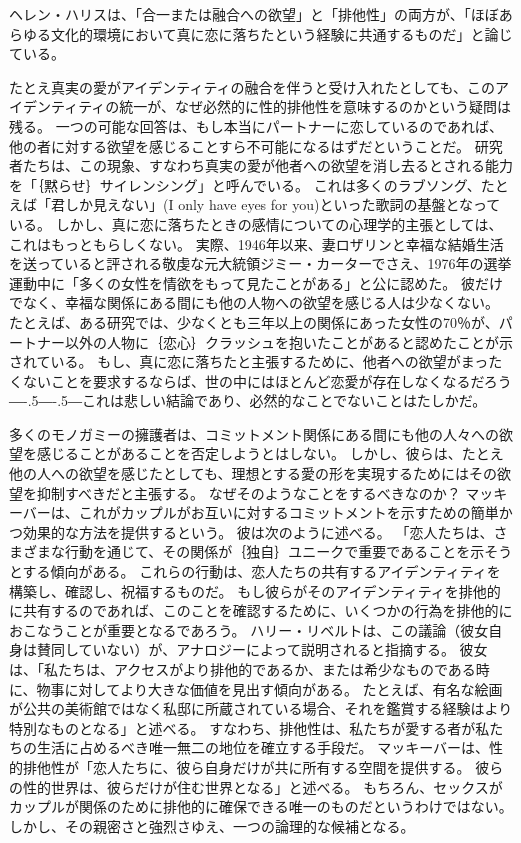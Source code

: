\documentclass[paper=a4,book,openany]{jlreq}
\newcommand{\ig}[1]{}           %
\def\DDASH{―\kern-.5\zw―\kern-.5\zw―} %
\begin{document}
ヘレン・ハリス\ig{Helen Harris}は、「合一または融合への欲望」と「排他性」の両方が、「ほぼあらゆる文化的環境において真に恋に落ちたという経験に共通するものだ」と論じている\citep[pp.102--103]{harris95:_rethin_polyn_heter_relat}。

たとえ真実の愛がアイデンティティの融合を伴うと受け入れたとしても、このアイデンティティの統一が、なぜ必然的に性的排他性を意味するのかという疑問は残る。
一つの可能な回答は、もし本当にパートナーに恋しているのであれば、他の者に対する欲望を感じることすら不可能になるはずだということだ。
研究者たちは、この現象、すなわち真実の愛が他者への欲望を消し去るとされる能力を「｛黙らせ｝{サイレンシング}」と呼んでいる。
これは多くのラブソング、たとえば「君しか見えない」(I only have eyes for you)といった歌詞の基盤となっている。
しかし、真に恋に落ちたときの感情についての心理学的主張としては、これはもっともらしくない。
実際、1946年以来、妻ロザリンと幸福な結婚生活を送っていると評される敬虔な元大統領ジミー・カーターでさえ、1976年の選挙運動中に「多くの女性を情欲をもって見たことがある」と公に認めた。
彼だけでなく、幸福な関係にある間にも他の人物への欲望を感じる人は少なくない。
たとえば、ある研究では、少なくとも三年以上の関係にあった女性の70％が、パートナー以外の人物に｛恋心｝{クラッシュ}を抱いたことがあると認めたことが示されている\citep{barnhart16:_women_exper_feelin_attrac_someon}。
もし、真に恋に落ちたと主張するために、他者への欲望がまったくないことを要求するならば、世の中にはほとんど恋愛が存在しなくなるだろう{\DDASH}これは悲しい結論であり、必然的なことでないことはたしかだ。

多くのモノガミーの擁護者は、コミットメント関係にある間にも他の人々への欲望を感じることがあることを否定しようとはしない。
しかし、彼らは、たとえ他の人への欲望を感じたとしても、理想とする愛の形を実現するためにはその欲望を抑制すべきだと主張する。
なぜそのようなことをするべきなのか？ マッキーバーは、これがカップルがお互いに対するコミットメントを示すための簡単かつ効果的な方法を提供するという。
彼は次のように述べる。
「恋人たちは、さまざまな行動を通じて、その関係が｛独自｝{ユニーク}で重要であることを示そうとする傾向がある。
これらの行動は、恋人たちの共有するアイデンティティを構築し、確認し、祝福するものだ。
もし彼らがそのアイデンティティを排他的に共有するのであれば、このことを確認するために、いくつかの行為を排他的におこなうことが重要となるであろう\citep[p.361]{mckeever17:_is_requir_sexual_exclus_consis_roman_love}。
ハリー・リベルトは、この議論（彼女自身は賛同していない）が、アナロジーによって説明されると指摘する。
彼女は、「私たちは、アクセスがより排他的であるか、または希少なものである時に、物事に対してより大きな価値を見出す傾向がある。
たとえば、有名な絵画が公共の美術館ではなく私邸に所蔵されている場合、それを鑑賞する経験はより特別なものとなる」と述べる\citep[p.410]{liberto17:_prob_sexual_prom}。
すなわち、排他性は、私たちが愛する者が私たちの生活に占めるべき唯一無二の地位を確立する手段だ。
マッキーバーは、性的排他性が「恋人たちに、彼ら自身だけが共に所有する空間を提供する。
彼らの性的世界は、彼らだけが住む世界となる」と述べる\citep[p.61]{mckeever17:_is_requir_sexual_exclus_consis_roman_love}。
もちろん、セックスがカップルが関係のために排他的に確保できる唯一のものだというわけではない。
しかし、その親密さと強烈さゆえ、一つの論理的な候補となる\citep[p.6]{york19:_why_monog_is_moral_permis}。
\end{document}
